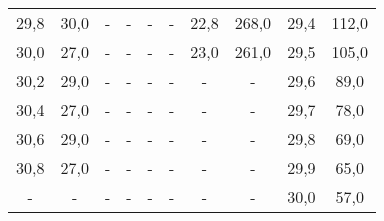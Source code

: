\begin{table}[htp]
\begin{center}
{\begin{tabular}{@{}cc|cc|cc|cc|cc@{}}
                        29,8 & 30,0 & - & - & - & - & 22,8 & 268,0 & 29,4 & 112,0\\
                        30,0 & 27,0 & - & - & - & - & 23,0 & 261,0 & 29,5 & 105,0\\
                        30,2 & 29,0 & - & - & - & - & - & - & 29,6 & 89,0\\
                        30,4 & 27,0 & - & - & - & - & - & - & 29,7 & 78,0\\
                        30,6 & 29,0 & - & - & - & - & - & - & 29,8 & 69,0\\
                        30,8 & 27,0 & - & - & - & - & - & - & 29,9 & 65,0\\
                        - & - & - & - & - &  - & - & - & 30,0 & 57,0\\
                \bottomrule
                \end{tabular}
                }
        \end{center}
\end{table}
